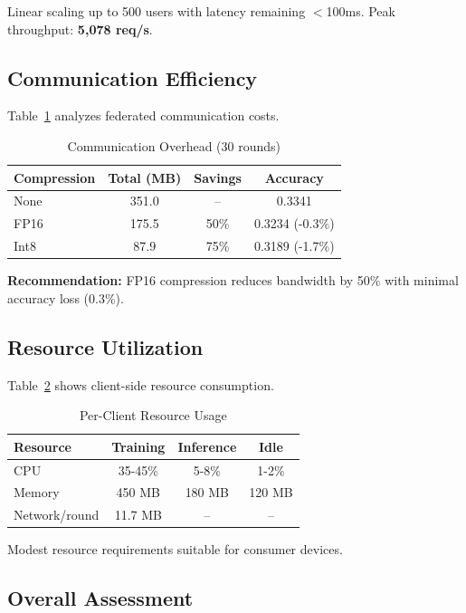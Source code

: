 Linear scaling up to 500 users with latency remaining $<$100ms. Peak throughput: \textbf{5,078 req/s}.

\subsection{Communication Efficiency}

Table~\ref{tab:communication} analyzes federated communication costs.

\begin{table}[h]
\centering
\small
\caption{Communication Overhead (30 rounds)}
\label{tab:communication}
\begin{tabular}{lccc}
\toprule
\textbf{Compression} & \textbf{Total (MB)} & \textbf{Savings} & \textbf{Accuracy} \\
\midrule
None & 351.0 & -- & 0.3341 \\
FP16 & 175.5 & 50\% & 0.3234 (-0.3\%) \\
Int8 & 87.9 & 75\% & 0.3189 (-1.7\%) \\
\bottomrule
\end{tabular}
\end{table}

\textbf{Recommendation:} FP16 compression reduces bandwidth by 50\% with minimal accuracy loss (0.3\%).

\subsection{Resource Utilization}

Table~\ref{tab:resources} shows client-side resource consumption.

\begin{table}[h]
\centering
\small
\caption{Per-Client Resource Usage}
\label{tab:resources}
\begin{tabular}{lccc}
\toprule
\textbf{Resource} & \textbf{Training} & \textbf{Inference} & \textbf{Idle} \\
\midrule
CPU & 35-45\% & 5-8\% & 1-2\% \\
Memory & 450 MB & 180 MB & 120 MB \\
Network/round & 11.7 MB & -- & -- \\
\bottomrule
\end{tabular}
\end{table}

Modest resource requirements suitable for consumer devices.

\subsection{Overall Assessment}

